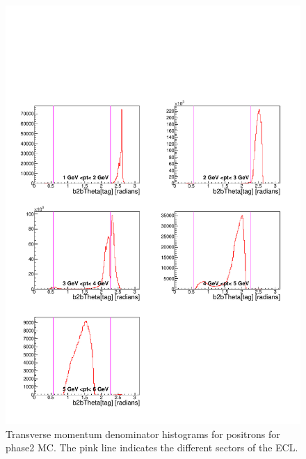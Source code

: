 \documentclass[a4paper,11pt,twosided,final,german,openbib,pdftex,listof=totoc,bibliography=totoc]{scrbook}
\begin{document}
\begin{appendix}
\begin{figure}[!htbp]
	\centering
	\includegraphics[width=\textwidth]{Plots/master/xPtMThetaepD_MC}
	\caption[Transverse Momentum $\theta$ Positron Denominator Histogram Phase2 MC]{Transverse momentum denominator histograms for positrons for phase2 MC. The pink line indicates the different sectors of the ECL.}
	\label{plt:PtMThetaepD_MC}
\end{figure}



\end{appendix}
\end{document}
